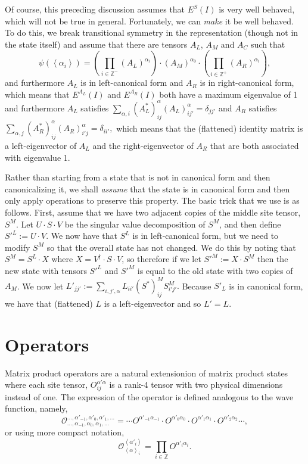 \documentclass{article}
\newcommand{\paren}[1]{\left(#1\right)}
\newcommand{\seq}[1]{\left<#1\right>}
\newcommand{\Z}{\mathbb{Z}}
\begin{document}
Of course, this preceding discussion assumes that $E^S(I)$ is very well behaved, which will not be true in general.  Fortunately, we can \emph{make} it be well behaved.  To do this, we break transitional symmetry in the representation (though not in the state itself) and assume that there are tensors $A_L$, $A_M$ and $A_C$ such that \begin{equation}
\label{eq:newform}
\psi(\seq{\alpha_i}) = \paren{\prod_{i\in\Z^-}(A_L)^{\alpha_i}}\cdot (A_M)^{\alpha_0}\cdot \paren{\prod_{i\in\Z^+}(A_R)^{\alpha_i}},\end{equation}
and furthermore $A_L$ is in left-canonical form and $A_R$ is in right-canonical form, which means that $E^{A_L}(I)$ and $E^{A_R}(I)$ both have a maximum eigenvalue of 1 and furthermore $A_L$ satisfies $\sum_{\alpha,i}(A_L^*)^{\alpha}_{ij}(A_L)^{\alpha}_{ij'}=\delta_{jj'}$ and $A_R$ satisfies $\sum_{\alpha,j}(A_R^*)^{\alpha}_{ij}(A_R)^{\alpha}_{i'j}=\delta_{ii'},$  which means that the (flattened) identity matrix is a left-eigenvector of $A_L$ and the right-eigenvector of $A_R$ that are both associated with eigenvalue 1.

Rather than starting from a state that is not in canonical form and then canonicalizing it, we shall \emph{assume} that the state is in canonical form and then only apply operations to preserve this property.  The basic trick that we use is as follows.  First, assume that we have two adjacent copies of the middle site tensor, $S^M$.  Let $U\cdot S\cdot V$ be the singular value decomposition of $S^M$, and then define $S'^L:=U\cdot V$.  We now have that $S^L$ is in left-canonical form, but we need to modify $S^M$ so that the overall state has not changed.  We do this by noting that $S^M=S^L\cdot X$ where $X=V^\dagger\cdot S\cdot V$, so therefore if we let $S'^M:= X\cdot S^M$ then the new state with tensors $S'^L$ and $S'^M$ is equal to the old state with two copies of $A_M$.  We now let $L'_{jj'}:=\sum_{i,j',\alpha}L_{ii'}(S^*)^M_{ij} S^M_{i'j'}.$  Because $S'_L$ is in canonical form, we have that (flattened) $L$ is a left-eigenvector and so $L'=L$.

\section{Operators}

Matrix product operators are a natural extensionion of matrix product states where each site tensor, $O^{\alpha'\alpha}_{ij}$ is a rank-4 tensor with two physical dimensions instead of one.  The expression of the operator is defined analogous to the wave function, namely,$$\mathcal{O}^{\dots,\alpha'_{-1},\alpha'_{0},\alpha'_1,\dots}_{\dots,\alpha_{-1},\alpha_{0},\alpha_1,\dots}= \cdots O^{\alpha'_{-1}\alpha_{-1}} \cdot O^{\alpha'_{0}\alpha_{0}}\cdot O^{\alpha'_{1}\alpha_{1}}\cdot O^{\alpha'_{2}\alpha_{2}}\cdots,$$ or using more compact notation,
$$\mathcal{O}^{\seq{\alpha'_i}}_{\seq{\alpha}_i} = \prod_{i\in\Z} O^{\alpha'_i\alpha_i}.$$
\end{document}
